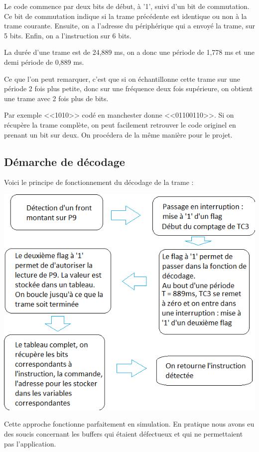 \documentclass[a4paper]{report}
\begin{document}
Le code commence par deux bits de début, à '1', suivi d'un bit de commutation.
Ce bit de commutation indique si la trame précédente est identique ou non à la trame courante.
Ensuite, on a l'adresse du périphérique qui a envoyé la trame, sur 5 bits.
Enfin, on a l'instruction sur 6 bits.

La durée d'une trame est de 24,889 ms, on a donc une période de 1,778 ms et une demi période de 0,889 ms.

Ce que l'on peut remarquer, c'est que si on échantillonne cette trame sur une période 2 fois plus petite, donc sur une fréquence deux fois supérieure, on obtient une trame avec 2 fois plus de bits.

Par exemple <<1010>> codé en manchester donne <<01100110>>.
Si on récupère la trame complète, on peut facilement retrouver le code originel en prenant un bit sur deux.
On procédera de la même manière pour le projet.

\subsection{Démarche de décodage}
Voici le principe de fonctionnement du décodage de la trame :

\begin{center}
	\includegraphics[scale=0.4]{images/RC_diagramme.png}
\end{center}

Cette approche fonctionne parfaitement en simulation.
En pratique nous avons eu des soucis concernant les buffers qui étaient défectueux et qui ne permettaient pas l’application.
\end{document}
